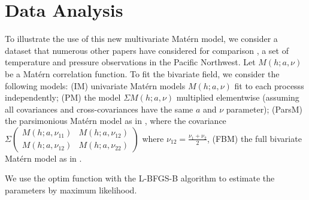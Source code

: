 \documentclass[11pt]{article}
\begin{document}
\begin{figure}
\label{fig:simulated_spatial}
\end{figure}



\section{Data Analysis}\label{sec:data_analysis}

To illustrate the use of this new multivariate Mat\'ern model, we consider a dataset that numerous other papers have considered for comparison \citep{gneiting_matern_2010,apanasovich_valid_2012, bolin_multivariate_nodate}, a set of temperature and pressure observations in the Pacific Northwest. Let $M(h; a, \nu)$ be a Mat\'ern correlation function. To fit the bivariate field, we consider the following models: (IM) univariate Mat\'ern models $M(h; a, \nu)$ fit to each processs independently; (PM) the model $\Sigma M(h; a, \nu)$ multiplied elementwise (assuming all covariances and cross-covariances have the same $a$ and $\nu$ parameter); (ParsM) the parsimonious Mat\'ern model as in \citep{gneiting_matern_2010}, where the covariance $\Sigma \begin{pmatrix}M(h; a, \nu_{11}) & M(h; a, \nu_{12}) \\ M(h; a, \nu_{12}) & M(h; a, \nu_{22})\end{pmatrix}$ where $\nu_{12} = \frac{\nu_1 + \nu_2}{2}$, (FBM) the full bivariate Mat\'ern model as in \cite{gneiting_matern_2010}.

We use the optim function with the L-BFGS-B algorithm to estimate the parameters by maximum likelihood. 

\end{document}
